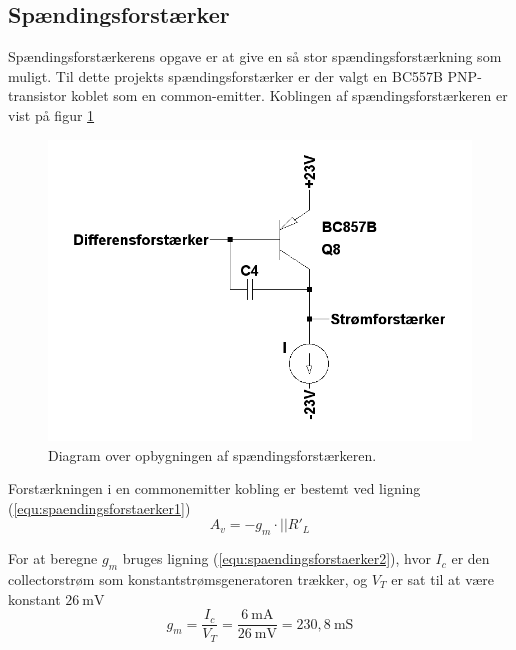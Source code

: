 \subsection{Spændingsforstærker}
\label{effekt_spaendingsforstaerker}
Spændingsforstærkerens opgave er at give en så stor spændingsforstærkning som muligt. Til dette projekts spændingsforstærker er der valgt en BC557B PNP-transistor koblet som en common-emitter. Koblingen af spændingsforstærkeren er vist på figur \ref{spaendingsforstaerker_diagram}

\begin{figure}[h]
\centering
\includegraphics[scale=0.3]{teknisk/effektforstaerker/spaendingsforstaerker_diagram.png}
\caption{Diagram over opbygningen af spændingsforstærkeren.}
\label{spaendingsforstaerker_diagram}
\end{figure}

Forstærkningen i en commonemitter kobling er bestemt ved ligning (\ref{equ:spaendingsforstaerker1}) \cite{ael-mm7}%
\begin{equation}
\label{equ:spaendingsforstaerker1}
A_v = -g_m \cdot || R'_L
\end{equation}

For at beregne $g_m$ bruges ligning (\ref{equ:spaendingsforstaerker2}), hvor $I_c$ er den collectorstrøm som konstantstrømsgeneratoren trækker, og $V_T$ er sat til at være konstant $26~\mathrm{mV}$
\begin{equation}
\label{equ:spaendingsforstaerker2}
g_m = \frac{I_c}{V_T} = \frac{6~\mathrm{mA}}{26~\mathrm{mV}} = 230,8~\mathrm{mS}
\end{equation}

